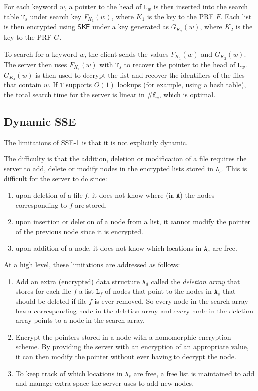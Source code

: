 \documentclass[12pt,a4paper]{article}
\theoremstyle{definition}
\begin{document}
For each keyword \(w\), a pointer to the head of \(\mathtt{L}_w\) is then
inserted into the search table \(\mathtt{T}_s\) under search key
\(F_{K_1}(w)\), where \(K_1\) is the key to the PRF \(F\). Each list
is then encrypted using \(\mathsf{SKE}\) under a key generated
as \(G_{K_2}(w)\), where \(K_2\) is the key to the PRF \(G\).

To search for a keyword \(w\), the client sends the values \(F_{K_1}(w)\) and
\(G_{K_2}(w)\). The server then uses \(F_{K_1}(w)\) with \(\mathtt{T}_s\)
to recover the pointer to the head of \(\mathtt{L}_w\).
\(G_{K_2}(w)\) is then used to decrypt the list and recover the identifiers
of the files that contain \(w\). If \(\mathtt{T}\) supports
\(O(1)\) lookups (for example, using a hash table),
the total search time for the server is linear in
\(\#\mathbf{f}_w\), which is optimal.
\clearpage

\subsection{Dynamic SSE}

The limitations of SSE-1 is that it is not explicitly dynamic.

The difficulty is that the addition, deletion or modification of a
file requires the server to add, delete or modify nodes in the
encrypted lists stored in \(\mathtt{A}_s\).
This is difficult for the server to do since:

\begin{enumerate}
\item upon deletion of a file \(f\), it does not know where
	(in \(\mathtt{A}\)) the nodes corresponding to \(f\) are stored.
\item upon insertion or deletion of a node from a list, it cannot
	modify the pointer of the previous node since it is encrypted.
\item upon addition of a node, it does not know which locations in
	\(\mathtt{A}_s\) are free.
\end{enumerate}

At a high level, these limitations are addressed as follows:


\begin{enumerate}
\item Add an extra (encrypted) data structure
	\(\mathtt{A}_d\) called the \emph{deletion array} that
	stores for each file \(f\) a list \(\mathtt{L}_f\)
	of nodes that point to the nodes in \(\mathtt{A}_s\) that should be
	deleted if file \(f\) is ever removed. So every node in the
	search array has a corresponding node in the deletion array and
	every node in the deletion array points to a node in the search array.
\item Encrypt the pointers stored in a node with
	a homomorphic encryption scheme. By providing the server with an
	encryption of an appropriate value, it can then modify the pointer
	without ever having to decrypt the node.
\item To keep track of which locations in \(\mathtt{A}_s\)
	are free, a free list is maintained to add and manage extra space
	the server uses to add new nodes.
\end{enumerate}
\clearpage
\end{document}
